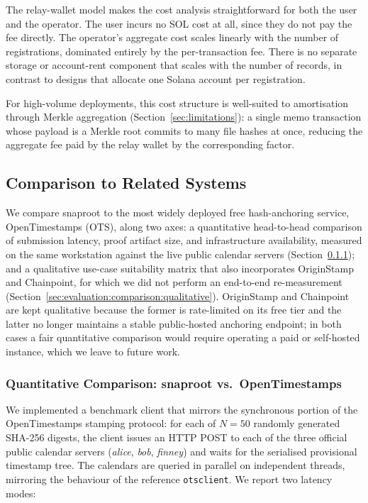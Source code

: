 \documentclass[11pt,a4paper]{article}
\begin{document}
The relay-wallet model makes the cost analysis straightforward for both
the user and the operator. The user incurs no SOL cost at all, since
they do not pay the fee directly. The operator's aggregate cost scales
linearly with the number of registrations, dominated entirely by the
per-transaction fee. There is no separate storage or account-rent
component that scales with the number of records, in contrast to
designs that allocate one Solana account per registration.

For high-volume deployments, this cost structure is well-suited to
amortisation through Merkle aggregation
(Section~\ref{sec:limitations}): a single memo transaction whose
payload is a Merkle root commits to many file hashes at once, reducing
the aggregate fee paid by the relay wallet by the corresponding factor.

\subsection{Comparison to Related Systems}
\label{sec:evaluation:comparison}

We compare snaproot to the most widely deployed free hash-anchoring
service, OpenTimestamps (OTS), along two axes: a quantitative
head-to-head comparison of submission latency, proof artifact size,
and infrastructure availability, measured on the same workstation
against the live public calendar servers
(Section~\ref{sec:evaluation:comparison:quantitative}); and a
qualitative use-case suitability matrix that also incorporates
OriginStamp and Chainpoint, for which we did not perform an end-to-end
re-measurement
(Section~\ref{sec:evaluation:comparison:qualitative}). OriginStamp
and Chainpoint are kept qualitative because the former is rate-limited
on its free tier and the latter no longer maintains a stable
public-hosted anchoring endpoint; in both cases a fair quantitative
comparison would require operating a paid or self-hosted instance,
which we leave to future work.

\subsubsection{Quantitative Comparison: snaproot vs.\ OpenTimestamps}
\label{sec:evaluation:comparison:quantitative}

We implemented a benchmark client that mirrors the synchronous portion
of the OpenTimestamps stamping protocol: for each of $N = 50$ randomly
generated SHA-256 digests, the client issues an HTTP POST to each of
the three official public calendar servers (\textit{alice},
\textit{bob}, \textit{finney}) and waits for the serialised provisional
timestamp tree. The calendars are queried in parallel on independent
threads, mirroring the behaviour of the reference \texttt{otsclient}.
We report two latency modes:
\end{document}
